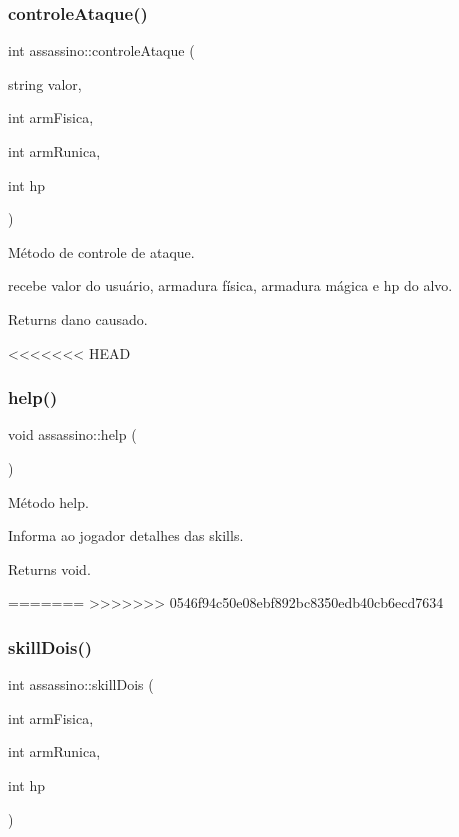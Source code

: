 \subsubsection{\texorpdfstring{controle\+Ataque()}{controleAtaque()}}
{\footnotesize\ttfamily int assassino\+::controle\+Ataque (\begin{DoxyParamCaption}\item[{string}]{valor,  }\item[{int}]{arm\+Fisica,  }\item[{int}]{arm\+Runica,  }\item[{int}]{hp }\end{DoxyParamCaption})}



Método de controle de ataque. 

recebe valor do usuário, armadura física, armadura mágica e hp do alvo. \begin{DoxyReturn}{Returns}
dano causado. 
\end{DoxyReturn}
<<<<<<< HEAD
\mbox{\label{classassassino_ae30c9da40ed8c746aa71e784fe20890d}} 
\subsubsection{\texorpdfstring{help()}{help()}}
{\footnotesize\ttfamily void assassino\+::help (\begin{DoxyParamCaption}{ }\end{DoxyParamCaption})}



Método help. 

Informa ao jogador detalhes das skills. \begin{DoxyReturn}{Returns}
void. 
\end{DoxyReturn}
=======
>>>>>>> 0546f94c50e08ebf892bc8350edb40cb6ecd7634
\mbox{\label{classassassino_acd757ef4b59c18d2aa504a6afa15b107}} 
\subsubsection{\texorpdfstring{skill\+Dois()}{skillDois()}}
{\footnotesize\ttfamily int assassino\+::skill\+Dois (\begin{DoxyParamCaption}\item[{int}]{arm\+Fisica,  }\item[{int}]{arm\+Runica,  }\item[{int}]{hp }\end{DoxyParamCaption})}



